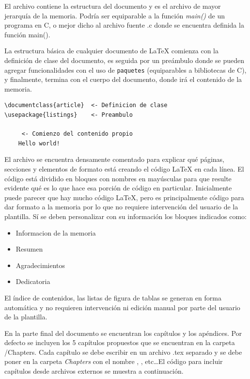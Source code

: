 El archivo  contiene la estructura del documento y es el archivo de mayor jerarquía de la memoria.  Podría ser equiparable a la función \emph{main()} de un programa en C, o mejor dicho al archivo fuente .c donde se encuentra definida la función main().

La estructura básica de cualquier documento de \LaTeX{} comienza con la definición de clase del documento, es seguida por un preámbulo donde se pueden agregar funcionalidades con el uso de \texttt{paquetes} (equiparables a bibliotecas de C), y finalmente, termina con el cuerpo del documento, donde irá el contenido de la memoria.


\begin{lstlisting}
\documentclass{article}  <- Definicion de clase
\usepackage{listings}	 <- Preambulo

	 <- Comienzo del contenido propio 
	Hello world!

\end{lstlisting}


El archivo  se encuentra densamente comentado para explicar qué páginas, secciones y elementos de formato está creando el código \LaTeX{} en cada línea. El código está dividido en bloques con nombres en mayúsculas para que resulte evidente qué es lo que hace esa porción de código en particular. Inicialmente puede parecer que hay mucho código \LaTeX{}, pero es principalmente código para dar formato a la memoria por lo que no requiere intervención del usuario de la plantilla.  Sí se deben personalizar con su información los bloques indicados como:

\begin{itemize}
	\item Informacion de la memoria
	\item Resumen
	\item Agradecimientos
	\item Dedicatoria
\end{itemize}

El índice de contenidos, las listas de figura de tablas se generan en forma automática y no requieren intervención ni edición manual por parte del usuario de la plantilla. 

En la parte final del documento se encuentran los capítulos y los apéndices.  Por defecto se incluyen los 5 capítulos propuestos que se encuentran en la carpeta /Chapters. Cada capítulo se debe escribir en un archivo .tex separado y se debe poner en la carpeta \emph{Chapters} con el nombre , , etc\ldots El código para incluir capítulos desde archivos externos se muestra a continuación.

